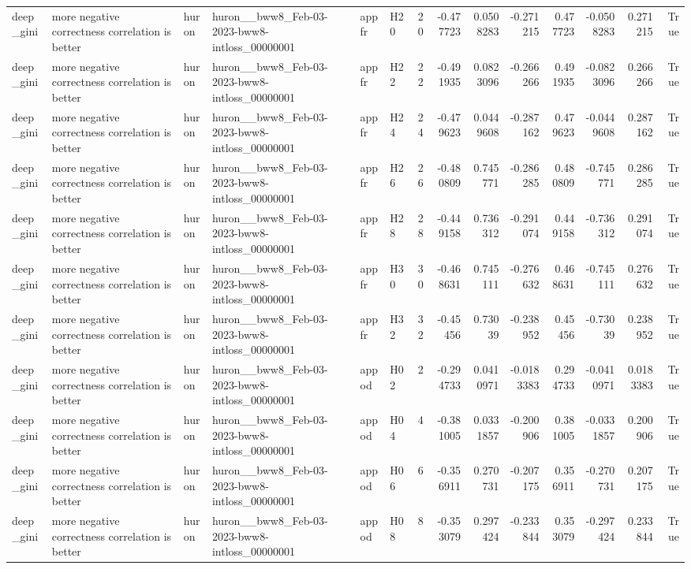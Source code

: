 \begin{longtable}{llllllrrrrrrrr}
deep\_gini & more negative correctness correlation is better & huron & huron\_\_bww8\_Feb-03-2023-bww8-intloss\_00000001 & appfr & H20 & 20 & -0.477723 & 0.0508283 & -0.271215 & 0.477723 & -0.0508283 & 0.271215 & True \\
deep\_gini & more negative correctness correlation is better & huron & huron\_\_bww8\_Feb-03-2023-bww8-intloss\_00000001 & appfr & H22 & 22 & -0.491935 & 0.0823096 & -0.266266 & 0.491935 & -0.0823096 & 0.266266 & True \\
deep\_gini & more negative correctness correlation is better & huron & huron\_\_bww8\_Feb-03-2023-bww8-intloss\_00000001 & appfr & H24 & 24 & -0.479623 & 0.0449608 & -0.287162 & 0.479623 & -0.0449608 & 0.287162 & True \\
deep\_gini & more negative correctness correlation is better & huron & huron\_\_bww8\_Feb-03-2023-bww8-intloss\_00000001 & appfr & H26 & 26 & -0.480809 & 0.745771 & -0.286285 & 0.480809 & -0.745771 & 0.286285 & True \\
deep\_gini & more negative correctness correlation is better & huron & huron\_\_bww8\_Feb-03-2023-bww8-intloss\_00000001 & appfr & H28 & 28 & -0.449158 & 0.736312 & -0.291074 & 0.449158 & -0.736312 & 0.291074 & True \\
deep\_gini & more negative correctness correlation is better & huron & huron\_\_bww8\_Feb-03-2023-bww8-intloss\_00000001 & appfr & H30 & 30 & -0.468631 & 0.745111 & -0.276632 & 0.468631 & -0.745111 & 0.276632 & True \\
deep\_gini & more negative correctness correlation is better & huron & huron\_\_bww8\_Feb-03-2023-bww8-intloss\_00000001 & appfr & H32 & 32 & -0.45456 & 0.73039 & -0.238952 & 0.45456 & -0.73039 & 0.238952 & True \\
deep\_gini & more negative correctness correlation is better & huron & huron\_\_bww8\_Feb-03-2023-bww8-intloss\_00000001 & appod & H02 & 2 & -0.294733 & 0.0410971 & -0.0183383 & 0.294733 & -0.0410971 & 0.0183383 & True \\
deep\_gini & more negative correctness correlation is better & huron & huron\_\_bww8\_Feb-03-2023-bww8-intloss\_00000001 & appod & H04 & 4 & -0.381005 & 0.0331857 & -0.200906 & 0.381005 & -0.0331857 & 0.200906 & True \\
deep\_gini & more negative correctness correlation is better & huron & huron\_\_bww8\_Feb-03-2023-bww8-intloss\_00000001 & appod & H06 & 6 & -0.356911 & 0.270731 & -0.207175 & 0.356911 & -0.270731 & 0.207175 & True \\
deep\_gini & more negative correctness correlation is better & huron & huron\_\_bww8\_Feb-03-2023-bww8-intloss\_00000001 & appod & H08 & 8 & -0.353079 & 0.297424 & -0.233844 & 0.353079 & -0.297424 & 0.233844 & True \\

\end{longtable}
